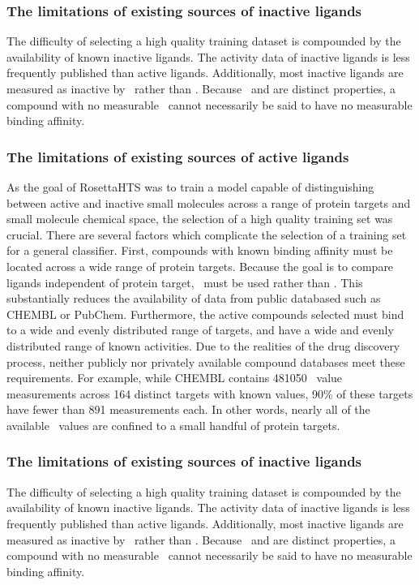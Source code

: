 \subsubsection{The limitations of existing sources of inactive ligands}
The difficulty of selecting a high quality training dataset is compounded by the availability of known inactive ligands. 
The activity data of inactive ligands is less frequently published than active ligands.
Additionally, most inactive ligands are measured as inactive by \ic\ rather than \ki.
Because \ic\ and \ki are distinct properties, a compound with no measurable \ic\ cannot necessarily be said to have no measurable binding affinity.

\subsubsection{The limitations of existing sources of active ligands}
As the goal of RosettaHTS was to train a model capable of distinguishing between active and inactive small molecules across a range of protein targets and small molecule chemical space, the selection of a high quality training set was crucial.
There are several factors which complicate the selection of a training set for a general classifier.
First, compounds with known binding affinity must be located across a wide range of protein targets.
Because the goal is to compare ligands independent of protein target, \ki\ must be used rather than \ic.
This substantially reduces the availability of data from public databased such as CHEMBL or PubChem. 
Furthermore, the active compounds selected must bind to a wide and evenly distributed range of targets, and have a wide and evenly distributed range of known activities.
Due to the realities of the drug discovery process, neither publicly nor privately available compound databases meet these requirements.
For example, while CHEMBL contains 481050 \ki\ value measurements across 164 distinct targets with known \ki values, 90\% of these targets have fewer than 891 measurements each.
In other words, nearly all of the available \ki\ values are confined to a small handful of protein targets.

\subsubsection{The limitations of existing sources of inactive ligands}
The difficulty of selecting a high quality training dataset is compounded by the availability of known inactive ligands. 
The activity data of inactive ligands is less frequently published than active ligands.
Additionally, most inactive ligands are measured as inactive by \ic\ rather than \ki.
Because \ic\ and \ki are distinct properties, a compound with no measurable \ic\ cannot necessarily be said to have no measurable binding affinity.

